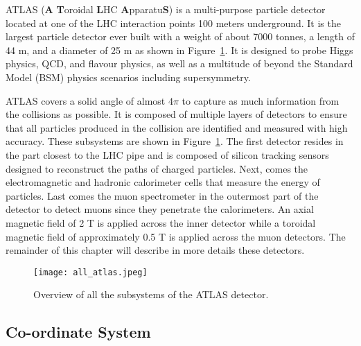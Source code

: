 ATLAS (\textbf{A} \textbf{T}oroidal \textbf{L}HC \textbf{A}pparatu\textbf{S}) is a 
multi-purpose particle detector located at one of the 
LHC interaction points 100 meters underground. 
It is the largest particle detector ever built with a weight of about 7000 tonnes, a length of 44 m, 
and a diameter of 25 m as shown in Figure~\ref{fig:exp.atlas.atlas}.
It is designed to probe Higgs physics, QCD, and flavour physics, as well as a multitude of beyond the Standard Model (BSM) physics scenarios including 
supersymmetry.

ATLAS covers a solid angle of almost $4\pi$ to capture as much information from the collisions 
as possible. 
It is composed of multiple layers of detectors to ensure that all particles produced in the 
collision are identified and measured with high accuracy.
These subsystems are shown in Figure~\ref{fig:exp.atlas.atlas}.
The first detector resides in the part closest to the
LHC pipe and is composed of silicon tracking sensors designed to reconstruct the paths
of charged particles. 
Next, comes the electromagnetic and hadronic calorimeter cells that 
measure the energy of particles. Last comes the muon spectrometer in the outermost part of the 
detector to detect muons since they penetrate the calorimeters. 
An axial magnetic field of 2 T is applied across the inner detector while a toroidal magnetic field 
of approximately 0.5 T is applied across the muon detectors.
The remainder of this chapter will describe in more details these detectors.




\begin{figure}[t!]
\centering
\texttt{[image: all\_atlas.jpeg]}
\caption{Overview of all the subsystems of the ATLAS detector.}%
\label{fig:exp.atlas.atlas}
\end{figure} 




\subsection{Co-ordinate System}

